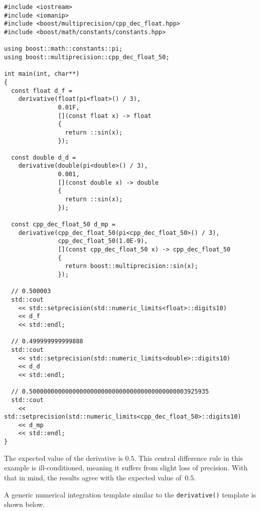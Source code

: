 \documentclass{article}[11pt,draft]
\begin{document}
\begin{lstlisting}
#include <iostream>
#include <iomanip>
#include <boost/multiprecision/cpp_dec_float.hpp>
#include <boost/math/constants/constants.hpp>

using boost::math::constants::pi;
using boost::multiprecision::cpp_dec_float_50;

int main(int, char**)
{
  const float d_f =
    derivative(float(pi<float>() / 3),
               0.01F,
               [](const float x) -> float
               {
                 return ::sin(x);
               });

  const double d_d =
    derivative(double(pi<double>() / 3),
               0.001,
               [](const double x) -> double
               {
                 return ::sin(x);
               });

  const cpp_dec_float_50 d_mp =
    derivative(cpp_dec_float_50(pi<cpp_dec_float_50>() / 3),
               cpp_dec_float_50(1.0E-9),
               [](const cpp_dec_float_50 x) -> cpp_dec_float_50
               {
                 return boost::multiprecision::sin(x);
               });

  // 0.500003
  std::cout
    << std::setprecision(std::numeric_limits<float>::digits10)
    << d_f
    << std::endl;

  // 0.499999999999888
  std::cout
    << std::setprecision(std::numeric_limits<double>::digits10)
    << d_d
    << std::endl;

  // 0.50000000000000000000000000000000000000000003925935
  std::cout
    << std::setprecision(std::numeric_limits<cpp_dec_float_50>::digits10)
    << d_mp
    << std::endl;
}
\end{lstlisting}

The expected value of the derivative is $0.5$.
This central difference rule in this example
is ill-conditioned, meaning it suffers from slight
loss of precision. With that in mind, the results agree
with the expected value of~$0.5$.

A generic numerical integration template similar to the
{\lstinline|derivative()|} template is shown below.
\end{document}
